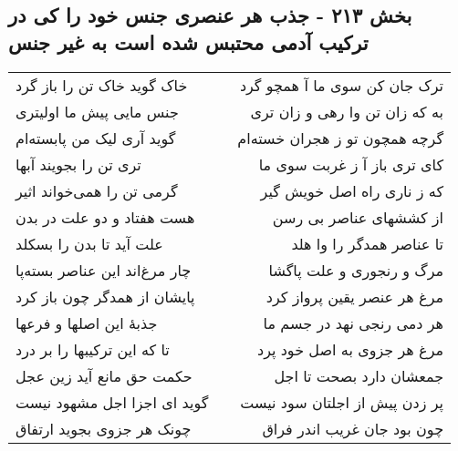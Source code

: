 \begin{center}
\section*{بخش ۲۱۳ - جذب هر عنصری جنس خود را کی در ترکیب آدمی محتبس شده است به غیر جنس}
\label{sec:sh213}
\begin{longtable}{l p{0.5cm} r}
خاک گوید خاک تن را باز گرد
&&
ترک جان کن سوی ما آ همچو گرد
\\
جنس مایی پیش ما اولیتری
&&
به که زان تن وا رهی و زان تری
\\
گوید آری لیک من پابسته‌ام
&&
گرچه همچون تو ز هجران خسته‌ام
\\
تری تن را بجویند آبها
&&
کای تری باز آ ز غربت سوی ما
\\
گرمی تن را همی‌خواند اثیر
&&
که ز ناری راه اصل خویش گیر
\\
هست هفتاد و دو علت در بدن
&&
از کششهای عناصر بی رسن
\\
علت آید تا بدن را بسکلد
&&
تا عناصر همدگر را وا هلد
\\
چار مرغ‌اند این عناصر بسته‌پا
&&
مرگ و رنجوری و علت پاگشا
\\
پایشان از همدگر چون باز کرد
&&
مرغ هر عنصر یقین پرواز کرد
\\
جذبهٔ این اصلها و فرعها
&&
هر دمی رنجی نهد در جسم ما
\\
تا که این ترکیبها را بر درد
&&
مرغ هر جزوی به اصل خود پرد
\\
حکمت حق مانع آید زین عجل
&&
جمعشان دارد بصحت تا اجل
\\
گوید ای اجزا اجل مشهود نیست
&&
پر زدن پیش از اجلتان سود نیست
\\
چونک هر جزوی بجوید ارتفاق
&&
چون بود جان غریب اندر فراق
\\
\end{longtable}
\end{center}
